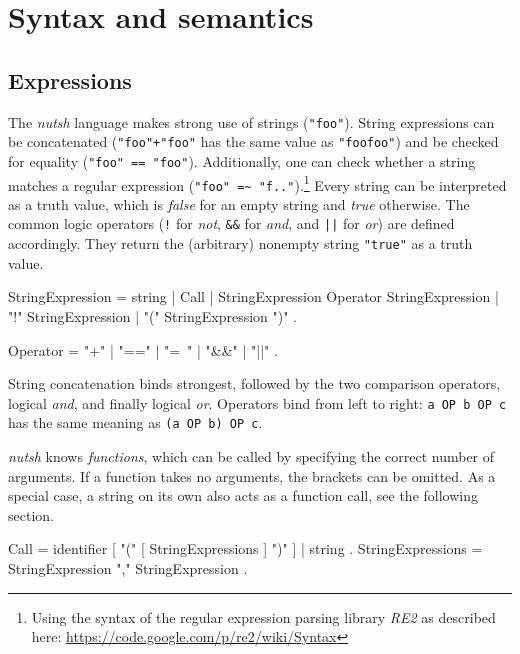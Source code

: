 \documentclass[paper=a4,twoside,abstract=on,cleardoublepage=empty,numbers=noenddot,toc=bib,toc=listof,12pt,appendixprefix=true]{scrreprt}
\begin{document}
\section{Syntax and semantics}

\subsection{Expressions}


The \emph{nutsh} language makes strong use of strings (\texttt{"foo"}). String expressions can be concatenated (\texttt{"foo"+"foo"} has the same value as \texttt{"foofoo"}) and be checked for equality (\texttt{"foo" == "foo"}). Additionally, one can check whether a string matches a regular expression (\texttt{"foo" =\textasciitilde\ "f.."}).\footnote{Using the syntax of the regular expression parsing library \emph{RE2} as described here: \url{https://code.google.com/p/re2/wiki/Syntax}} Every string can be interpreted as a truth value, which is \emph{false} for an empty string and \emph{true} otherwise. The common logic operators (\texttt{!} for \emph{not}, \texttt{\&\&} for \emph{and}, and \texttt{||} for \emph{or}) are defined accordingly. They return the (arbitrary) nonempty string \texttt{"true"} as a truth value.

\begin{ebnf}
StringExpression =
    string | Call | StringExpression Operator StringExpression |
    "!" StringExpression | "(" StringExpression ")" .

Operator = "+" | "==" | "=~" | "&&" | "||" .
\end{ebnf}


String concatenation binds strongest, followed by the two comparison operators, logical \emph{and}, and finally logical \emph{or}. Operators bind from left to right: \texttt{a OP b OP c} has the same meaning as \texttt{(a OP b) OP c}.


\emph{nutsh} knows \emph{functions}, which can be called by specifying the correct number of arguments. If a function takes no arguments, the brackets can be omitted. As a special case, a string on its own also acts as a function call, see the following section.

\begin{ebnf}
Call = identifier [ "(" [ StringExpressions ] ")" ] | string .
StringExpressions = StringExpression { "," StringExpression } .
\end{ebnf}
\end{document}
